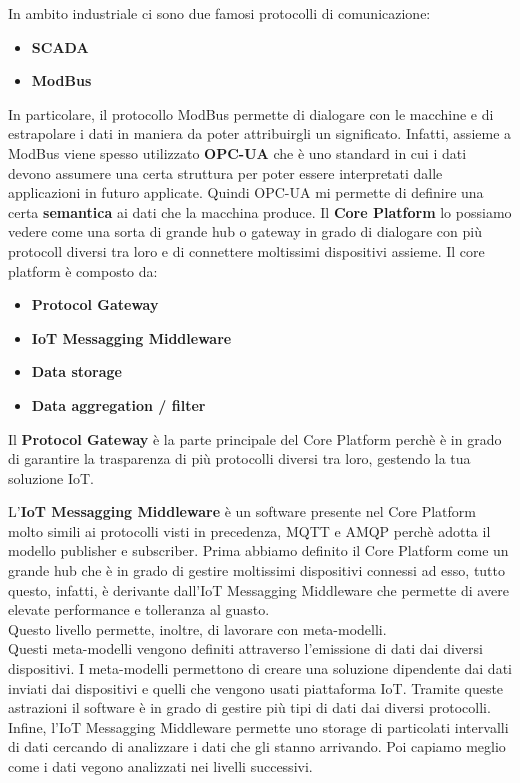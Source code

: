 \documentclass[10pt,a4paper,oneside]{scrbook}
\begin{document}
In ambito industriale ci sono due famosi protocolli di comunicazione:
\begin{itemize}
    \item \textbf{SCADA}
    \item \textbf{ModBus}
\end{itemize}
In particolare, il protocollo ModBus permette di dialogare con le macchine e di estrapolare i dati in maniera da poter attribuirgli un significato.
Infatti, assieme a ModBus viene spesso utilizzato \textbf{OPC-UA} che è uno standard in cui i dati devono assumere una certa struttura per poter essere interpretati
dalle applicazioni in futuro applicate. Quindi OPC-UA mi permette di definire una certa \textbf{semantica} ai dati che la macchina produce. 
Il \textbf{Core Platform} lo possiamo vedere come una sorta di grande hub o gateway in grado di dialogare con più protocoll diversi tra loro e di connettere moltissimi dispositivi assieme.
Il core platform è composto da:
\begin{itemize}
    \item \textbf{Protocol Gateway}
    \item \textbf{IoT Messagging Middleware}
    \item \textbf{Data storage}
    \item  \textbf{Data aggregation / filter}
\end{itemize}
Il \textbf{Protocol Gateway} è la parte principale del Core Platform perchè è in grado di garantire la trasparenza di più protocolli diversi tra loro, gestendo la tua soluzione IoT.

L'\textbf{IoT Messagging Middleware} è un software presente nel Core Platform molto simili ai protocolli visti in precedenza, MQTT e AMQP perchè adotta il modello publisher e subscriber.
Prima abbiamo definito il Core Platform come un grande hub che è in grado di gestire moltissimi dispositivi connessi ad esso, tutto questo, infatti, è derivante dall'IoT Messagging Middleware che permette di avere elevate performance e tolleranza al guasto.\\
Questo livello permette, inoltre, di lavorare con meta-modelli.\\
Questi meta-modelli vengono definiti attraverso l'emissione di dati dai diversi dispositivi. I meta-modelli permettono di creare una soluzione dipendente dai dati inviati dai dispositivi e quelli che vengono usati piattaforma IoT. Tramite queste astrazioni il software è in grado di gestire più tipi di dati dai diversi protocolli. Infine, l'IoT Messagging Middleware permette uno storage di particolati intervalli di dati cercando di analizzare i dati che gli stanno arrivando. Poi capiamo meglio come i dati vegono analizzati nei livelli successivi.
\end{document}
